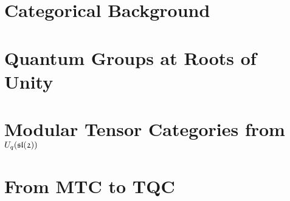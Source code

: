 \mediumspacing

\chapter{Categorical Background} 
\label{chap:categoricalbackground} 
\singlespacing


\mediumspacing

\chapter{Quantum Groups at Roots of Unity} 
\label{chap:uqsl2} 
\singlespacing


\mediumspacing


\chapter{Modular Tensor Categories from $U_q(\mathfrak{\mathfrak{sl}(2)})$} 
\label{chap:MTCfromuqsl2} 
\singlespacing


\mediumspacing

\chapter{From MTC to TQC} 
\label{chap:MTCtoTQC} 
\singlespacing


\mediumspacing


\clearpage
{}
\nocite{*}




%



